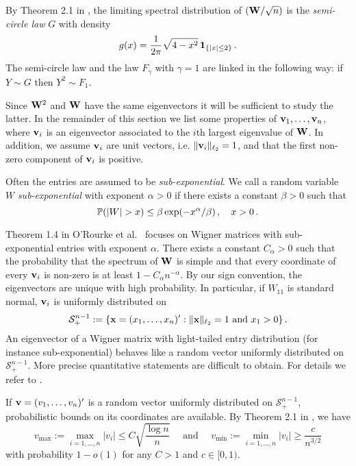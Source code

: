 By Theorem 2.1 in \cite{bai:fang:liang:2014}, the limiting spectral distribution of $({\mathbf W} /\sqrt{n})$ is the {\em semi-circle law} $G$ with density
\begin{equation}\label{eq:semi-circle}
g(x)=\frac{1}{2\pi} \sqrt{4-x^2}\, \mathbf{1}_{\{ |x|\le 2 \}}\,.
\end{equation}
The semi-circle law and the \MP law $F_{\gamma}$ with $\gamma=1$ are linked in the following way: if $Y\sim G$ then $Y^2\sim F_1$. 

Since ${\mathbf W}^2$ and ${\mathbf W}$ have the same eigenvectors it will be sufficient to study the latter. In the remainder of this section we list some properties of ${\mathbf v}_1, \ldots, {\mathbf v}_n$, where ${\mathbf v}_i$ is an eigenvector associated to the $i$th largest eigenvalue of ${\mathbf W}$. In addition, we assume ${\mathbf v}_i$ are unit vectors, i.e. $\|{\mathbf v}_i\|_{\ell_2}=1$, and that the first non-zero component of ${\mathbf v}_i$ is positive.

Often the entries are assumed to be {\em sub-exponential}. We call a random variable $W$ {\em sub-exponential} with exponent $\alpha>0$ if there exists a constant $\beta>0$ such that 
\begin{equation*}
\P(|W|>x)\le \beta \exp(-x^\alpha /\beta)\,,\quad x>0\,.
\end{equation*}

Theorem 1.4 in O'Rourke et al.~\cite{orourke:vu:wang:2016} focuses on Wigner matrices with sub-exponential entries with exponent $\alpha$. There exists a constant $C_{\alpha}>0$ such that the probability that the spectrum of ${\mathbf W}$ is simple and that every coordinate of every ${\mathbf v}_i$ is non-zero is at least $1-C_{\alpha} n^{-\alpha}$. By our sign convention, the eigenvectors are unique with high probability. In particular, if $W_{11}$ is standard normal, ${\mathbf v}_i$ is uniformly distributed on 
\begin{equation*}
\mathcal{S}_+^{n-1}:=\{ {\mathbf x}=(x_1,\ldots,x_n)': \|{\mathbf x}\|_{\ell_2}=1 \text{ and } x_1>0 \}\,.
\end{equation*}
An eigenvector of a Wigner matrix with light-tailed entry distribution (for instance sub-exponential) behaves like a random vector uniformly distributed on $\mathcal{S}_+^{n-1}$. More precise quantitative statements are difficult to obtain. For details we refer to \cite{orourke:vu:wang:2016}.

If ${\mathbf v}=(v_1,\ldots,v_n)'$ is a random vector uniformly distributed on $\mathcal{S}_+^{n-1}$, probabilistic bounds on its coordinates are available. By Theorem 2.1 in \cite{orourke:vu:wang:2016}, we have 
\begin{equation}\label{eq:coordinates}
v_{\text{max}} := \max_{i=1,\ldots,n} |v_i| \le C\sqrt{\frac{\log n}{n}}\quad \text{ and } \quad v_{\text{min}} := \min_{i=1,\ldots,n} |v_i|\ge \frac{c}{n^{3/2}}
\end{equation}
with probability $1-o(1)$ for any $C>1$ and $c\in [0,1)$. 

